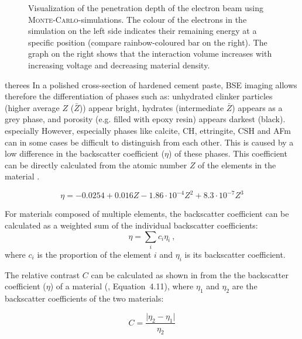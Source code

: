 \begin{figure}[!htb]
\begin{subfigure}[t]{0.48\textwidth}
	\end{subfigure}

    \caption{
        Visualization of the penetration depth of the electron beam using \textsc{Monte-Carlo}-simulations.
        The colour of the electrons in the simulation on the left side indicates their remaining energy at a specific position (compare rainbow-coloured bar on the right).
        The graph on the right shows that the interaction volume increases with increasing voltage and decreasing material density.
    }
    \label{fig:penetration_depth}
\end{figure}
therees
In a polished cross-section of hardened cement paste, \ac{BSE} imaging allows therefore the differentiation of phases such as: unhydrated clinker particles (higher average $Z$ ($\bar{Z}$)) appear bright, hydrates (intermediate $\bar{Z}$) appears as a grey phase, and porosity (e.g. filled with epoxy resin) appears darkest (black).
 especially
However, especially phases like calcite, \ac{CH}, ettringite, \ac{CSH} and \ac{AFm} can in some cases be difficult to distinguish from each other.
This is caused by a low difference in the backscatter coefficient ($\eta$) of these phases.
This coefficient can be directly calculated from the atomic number $Z$ of the elements in the material \cite{reuter.1972,goldstein.1992a}.

\begin{equation}
    \label{eq:bse_eta}
    \eta = -0.0254 + 0.016Z - 1.86 \cdot 10^{-4}Z^2 + 8.3 \cdot 10^{-7}Z^3
\end{equation}

For materials composed of multiple elements, the backscatter coefficient can be calculated as a weighted sum of the individual backscatter coefficients:
\begin{equation}
    \eta = \sum_{i} c_i \eta_i ~, 
\end{equation}
where $c_i$ is the proportion of the element $i$ and $\eta_i$ is its backscatter coefficient.

The relative contrast $C$ can be calculated as shown in  from the the backscatter coefficient ($\eta$) of a material (\cite{goldstein.1992}, Equation~4.11), where $\eta_1$ and $\eta_2$ are the backscatter coefficients of the two materials:

\begin{equation}
    C = \frac{\lvert \eta_2 - \eta_1 \rvert}{\eta_2}
    \label{eq:bse_contrast}
\end{equation}

